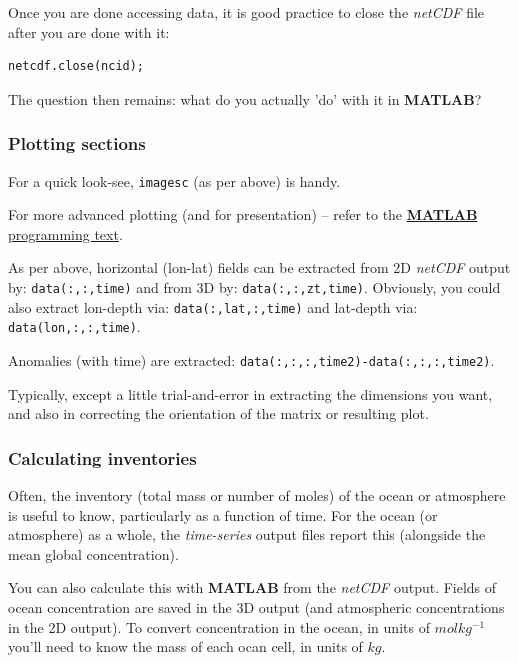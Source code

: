 \documentclass[11pt,fleqn]{book} %
\begin{document}
Once you are done accessing data, it is good practice to close the \textit{netCDF} file after you are done with it:
\begin{verbatim}
netcdf.close(ncid);
\end{verbatim}

The question then remains: what do you actually 'do' with it in \textbf{MATLAB}?


\subsubsection{Plotting sections}

For a quick look-see, \texttt{imagesc} (as per above) is handy.

\noindent For more advanced plotting (and for presentation) -- refer to the  \href{http://www.seao2.info//teaching/201718.GEO111/GEO111.pdf}{\textbf{MATLAB} programming text}.

\noindent As per above, horizontal (lon-lat) fields can be extracted from 2D \textit{netCDF} output by: \texttt{data(:,:,time)} and from 3D by: \texttt{data(:,:,zt,time)}. Obviously, you could also extract lon-depth via: \texttt{data(:,lat,:,time)} and lat-depth via: \texttt{data(lon,:,:,time)}.

\noindent Anomalies (with time) are extracted: \texttt{data(:,:,:,time2)-data(:,:,:,time2)}.

Typically, except a little trial-and-error in extracting the dimensions you want, and also in correcting the orientation of the matrix or resulting plot.


\subsubsection{Calculating inventories}

Often, the inventory (total mass or number of moles) of the ocean or atmosphere is useful to know, particularly as a function of time. For the ocean (or atmosphere) as a whole, the \textit{time-series} output files report this (alongside the mean global concentration).

You can also calculate this with \textbf{MATLAB} from the \textit{netCDF} output. Fields of ocean concentration are saved in the 3D output (and atmospheric concentrations in the 2D output). To convert concentration in the ocean, in units of \(molkg^{-1}\) you'll need to know the mass of each ocan cell, in units of \(kg\). 
\end{document}
